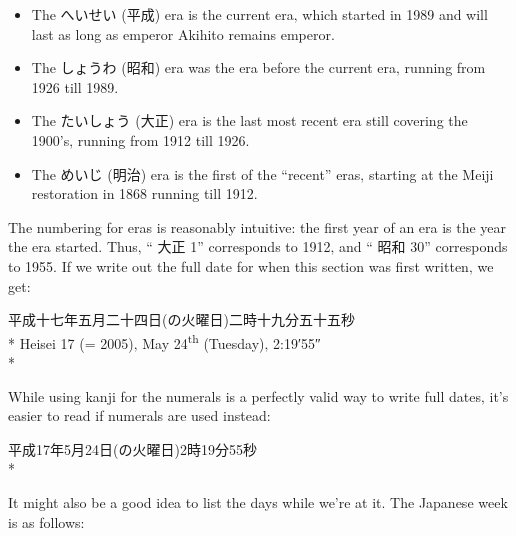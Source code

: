 \documentclass[11pt, b5paper, twoside, openright, onecolumn]{book}
\makeatletter
\newcommand*{\rubystack}[2]{{\relscale{0.5}%
  \begin{tabular}[b]{@{}c@{}}%
    {#1}\\%
   {\textscale{2}{#2}}%
  \end{tabular}}%
}
\DeclareRobustCommand*{\ruby}[2]{%
  \mbox{%
    \setlength{\parskip}{0ex}%
    \BeginAccSupp{method=pdfstringdef,ActualText={#1}}%
      \rubystack{\phantom{#2}}{#1}%
      \llap{%
        \rubystack{#2}{\phantom{#1}}%
      }%
    \EndAccSupp{}%
  }%
}
\renewcommand*{\ruby}[2]{#2 (#1)}%
\newenvironment{exampleblock}{
\setlength{\parindent}{0.6in}
\begin{minipage}[t]{\dimexpr\textwidth-\parindent}}
{\end{minipage}}
\makeatother
\begin{document}
\begin{itemize}
\item The \ruby{平成}{へいせい} era is the current era‚ which started in 1989 and will last as long as emperor Akihito remains emperor.
\item The \ruby{昭和}{しょうわ} era was the era before the current era‚ running from 1926 till 1989.
\item The \ruby{大正}{たいしょう} era is the last most recent era still covering the 1900’s‚ running from 1912 till 1926.
\item The \ruby{明治}{めいじ} era is the first of the “recent” eras‚ starting at the Meiji restoration in 1868 running till 1912.
\end{itemize}

The numbering for eras is reasonably intuitive: the first year of an era is the year the era started. Thus‚ “ 大正 1” corresponds to 1912‚ and “ 昭和 30” corresponds to 1955. If we write out the full date for when this section was first written‚ we get:

\vspace{0.4cm}
\begin{exampleblock}
平成十七年五月二十四日(の火曜日)二時十九分五十五秒 \\* 
Heisei 17 (= 2005)‚ May 24\textsuperscript{th} (Tuesday)‚ 2:19′55″ \\* 
\end{exampleblock}
\vspace{0.2cm}

While using kanji for the numerals is a perfectly valid way to write full dates‚ it’s easier to read if numerals are used instead:

\vspace{0.4cm}
\begin{exampleblock}
平成17年5月24日(の火曜日)2時19分55秒 \\* 
\end{exampleblock}
\vspace{0.2cm}

It might also be a good idea to list the days while we’re at it. The Japanese week is as follows:
\end{document}
